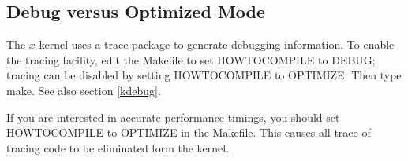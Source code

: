 \subsection{Debug versus Optimized Mode}

The $x$-kernel uses a trace package to generate debugging information.
To enable the tracing facility, edit the Makefile to set {\sanss
HOWTOCOMPILE} to {\sanss DEBUG}; tracing can be disabled by setting {\sanss
HOWTOCOMPILE} to {\sanss OPTIMIZE}. Then type {\sanss make}.  See also
section \ref{kdebug}.

If you are interested in accurate performance timings, you should set
{\sanss HOWTOCOMPILE} to {\sanss OPTIMIZE} in the Makefile.  This
causes all trace of tracing code to be eliminated form the kernel.





